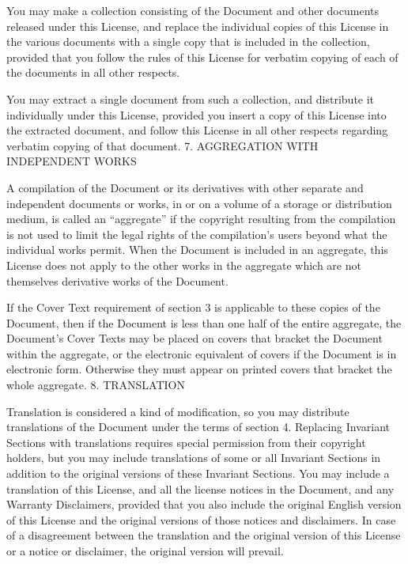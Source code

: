 \documentclass[letterpaper,10pt,english]{sphinxmanual}
\begin{document}
\sphinxAtStartPar
You may make a collection consisting of the Document and other documents released under this License, and replace the individual copies of this License in the various documents with a single copy that is included in the collection, provided that you follow the rules of this License for verbatim copying of each of the documents in all other respects.

\sphinxAtStartPar
You may extract a single document from such a collection, and distribute it individually under this License, provided you insert a copy of this License into the extracted document, and follow this License in all other respects regarding verbatim copying of that document.
7. AGGREGATION WITH INDEPENDENT WORKS

\sphinxAtStartPar
A compilation of the Document or its derivatives with other separate and independent documents or works, in or on a volume of a storage or distribution medium, is called an “aggregate” if the copyright resulting from the compilation is not used to limit the legal rights of the compilation’s users beyond what the individual works permit. When the Document is included in an aggregate, this License does not apply to the other works in the aggregate which are not themselves derivative works of the Document.

\sphinxAtStartPar
If the Cover Text requirement of section 3 is applicable to these copies of the Document, then if the Document is less than one half of the entire aggregate, the Document’s Cover Texts may be placed on covers that bracket the Document within the aggregate, or the electronic equivalent of covers if the Document is in electronic form. Otherwise they must appear on printed covers that bracket the whole aggregate.
8. TRANSLATION

\sphinxAtStartPar
Translation is considered a kind of modification, so you may distribute translations of the Document under the terms of section 4. Replacing Invariant Sections with translations requires special permission from their copyright holders, but you may include translations of some or all Invariant Sections in addition to the original versions of these Invariant Sections. You may include a translation of this License, and all the license notices in the Document, and any Warranty Disclaimers, provided that you also include the original English version of this License and the original versions of those notices and disclaimers. In case of a disagreement between the translation and the original version of this License or a notice or disclaimer, the original version will prevail.
\end{document}
